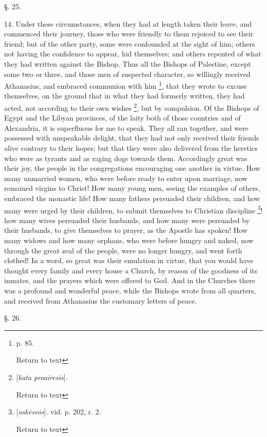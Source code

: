 §. 25.

14. Under these circumstances, when they had at
length taken their leave, and commenced their journey, those who were
friendly to them rejoiced to see their friend; but of the other party,
some were confounded at the sight of him; others not having the
confidence to appear, hid themselves; and others repented of what they
had written against the Bishop. Thus all the Bishops of Palestine,
except some two or three, and those men of suspected character, so
willingly received Athanasius, and embraced communion with him \footnote{p. 85.

Return to text}, that they wrote to excuse themselves, on the ground that in
what they had formerly written, they had acted, not according to their
own wishes \footnote{[\emph{kata proairesis}].

Return to text}, but by
compulsion. Of the Bishops of Egypt and the Libyan provinces, of the
laity both of those countries and of Alexandria, it is superfluous for
me to speak. They all ran together, and were possessed with
unspeakable delight, that they had not only received their friends
alive contrary to their hopes; but that they were also delivered
from the heretics who were as tyrants and as raging dogs towards them.
Accordingly great was their joy, the people in the congregations
encouraging one another in virtue. How many unmarried women, who were
before ready to enter upon marriage, now remained virgins to Christ!
How many young men, seeing the examples of others, embraced the
monastic life! How many fathers persuaded their children, and how many
were urged by their children, to submit themselves to Christian
discipline \footnote{[\emph{ask\={e}se\={o}s}]. vid. p. 202, r. 2.

Return to text}! how many
wives persuaded their husbands, and how many were persuaded by their
husbands, to give themselves to prayer, as the Apostle has spoken! How
many widows and how many orphans, who were before hungry and naked,
now through the great zeal of the people, were no longer hungry, and
went forth clothed! In a word, so great was their emulation in virtue,
that you would have thought every family and every house a Church, by
reason of the goodness of its inmates, and the prayers which were
offered to God. And in the Churches there was a profound and wonderful
peace, while the Bishops wrote from all quarters, and received from
Athanasius the customary letters of peace.

§. 26.

